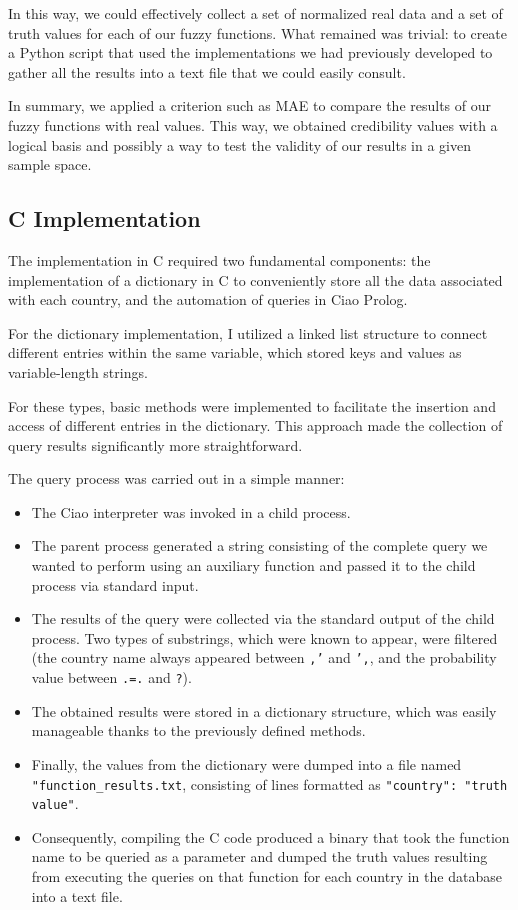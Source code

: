 \documentclass[fleqn,11pt]{article}
\begin{document}
In this way, we could effectively collect a set of normalized real data and a set of truth values for each of our fuzzy functions. What remained was trivial: to create a Python script that used the implementations we had previously developed to gather all the results into a text file that we could easily consult.

In summary, we applied a criterion such as MAE to compare the results of our fuzzy functions with real values. This way, we obtained credibility values with a logical basis and possibly a way to test the validity of our results in a given sample space.

\newpage
\subsection{C Implementation}

The implementation in C required two fundamental components: the implementation of a dictionary in C to conveniently store all the data associated with each country, and the automation of queries in Ciao Prolog.

For the dictionary implementation, I utilized a linked list structure to connect different entries within the same variable, which stored keys and values as variable-length strings.

For these types, basic methods were implemented to facilitate the insertion and access of different entries in the dictionary. This approach made the collection of query results significantly more straightforward.

The query process was carried out in a simple manner:
\begin{itemize}
    \item The Ciao interpreter was invoked in a child process.
    \item The parent process generated a string consisting of the complete query we wanted to perform using an auxiliary function and passed it to the child process via standard input.
    \item The results of the query were collected via the standard output of the child process. Two types of substrings, which were known to appear, were filtered (the country name always appeared between \texttt{,'} and \texttt{',}, and the probability value between \texttt{.=.} and \texttt{?}).
    \item The obtained results were stored in a dictionary structure, which was easily manageable thanks to the previously defined methods.
    \item Finally, the values from the dictionary were dumped into a file named \texttt{"function\_results.txt}, consisting of lines formatted as \texttt{"country": "truth value"}.
    \item Consequently, compiling the C code produced a binary that took the function name to be queried as a parameter and dumped the truth values resulting from executing the queries on that function for each country in the database into a text file.
\end{itemize}
\end{document}
